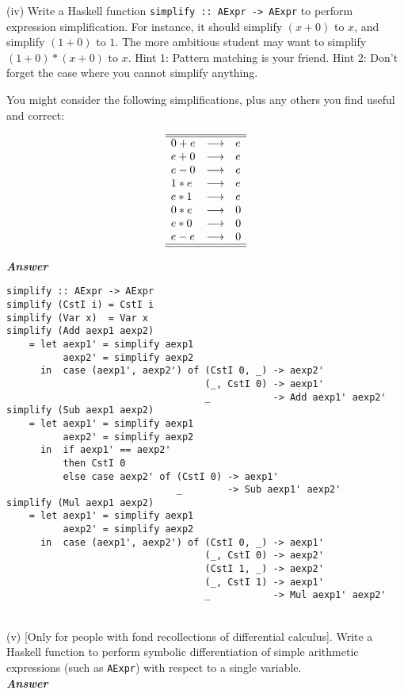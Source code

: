 \documentclass[a4paper]{article}
\begin{document}
\begin{exercise}
\noindent
(iv) Write a Haskell function \texttt{simplify ::\ AExpr -> AExpr} to
perform expression simplification.  For instance, it should simplify
$(x+0)$ to $x$, and simplify $(1+0)$ to $1$.  The more ambitious
student may want to simplify $(1+0)*(x+0)$ to $x$.  Hint 1: Pattern
matching is your friend.  Hint 2: Don't forget the case where you
cannot simplify anything.

You might consider the following simplifications, plus any others you
find useful and correct:

\begin{displaymath}
  \begin{array}{lcl}\hline\hline
    0 + e & \longrightarrow & e\\
    e + 0 & \longrightarrow & e\\
    e - 0 & \longrightarrow & e\\
    1 * e & \longrightarrow & e\\
    e * 1 & \longrightarrow & e\\
    0 * e & \longrightarrow & 0\\
    e * 0 & \longrightarrow & 0\\
    e - e & \longrightarrow & 0\\\hline\hline
  \end{array}
\end{displaymath}
  
\noindent
\textbf{\emph{Answer}}
{\codesetup\begin{verbatim}
simplify :: AExpr -> AExpr
simplify (CstI i) = CstI i
simplify (Var x)  = Var x
simplify (Add aexp1 aexp2) 
    = let aexp1' = simplify aexp1 
          aexp2' = simplify aexp2 
      in  case (aexp1', aexp2') of (CstI 0, _) -> aexp2' 
                                   (_, CstI 0) -> aexp1'
                                   _           -> Add aexp1' aexp2'
simplify (Sub aexp1 aexp2) 
    = let aexp1' = simplify aexp1 
          aexp2' = simplify aexp2 
      in  if aexp1' == aexp2' 
          then CstI 0 
          else case aexp2' of (CstI 0) -> aexp1' 
                              _        -> Sub aexp1' aexp2'
simplify (Mul aexp1 aexp2) 
    = let aexp1' = simplify aexp1 
          aexp2' = simplify aexp2 
      in  case (aexp1', aexp2') of (CstI 0, _) -> aexp1' 
                                   (_, CstI 0) -> aexp2'
                                   (CstI 1, _) -> aexp2'
                                   (_, CstI 1) -> aexp1'
                                   _           -> Mul aexp1' aexp2'
\end{verbatim}}\\

\noindent
(v) [Only for people with fond recollections of differential
calculus].  Write a Haskell function to perform symbolic differentiation
of simple arithmetic expressions (such as \texttt{AExpr}) with respect
to a single variable. \\  

\noindent
\textbf{\emph{Answer }}{\color{red}{Unsure about answer.}}\\
\end{exercise}
\end{document}
